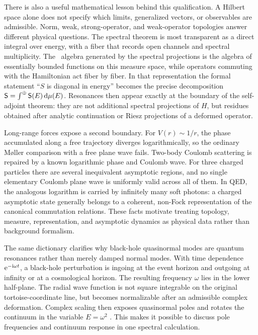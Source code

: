 There is also a useful mathematical lesson behind this qualification.  A
Hilbert space alone does not specify which limits, generalized vectors, or
observables are admissible.  Norm, weak, strong-operator, and weak-operator
topologies answer different physical questions.  The spectral theorem is most
transparent as a direct integral over energy, with a fiber that records open
channels and spectral multiplicity.  The \vN\ algebra generated by the
spectral projections is the algebra of essentially bounded functions on this
measure space, while operators commuting with the Hamiltonian act fiber by
fiber.  In that representation the formal statement ``$S$ is diagonal in
energy'' becomes the precise decomposition
$\mathsf{S}=\int^\oplus \mathsf{S}(E)\,\mathrm{d}\mu(E)$.
Resonances then appear exactly at the boundary of the self-adjoint theorem:
they are not additional spectral projections of $H$, but residues obtained
after analytic continuation or Riesz projections of a deformed operator.

Long-range forces expose a second boundary.  For $V(r)\sim 1/r$, the phase
accumulated along a free trajectory diverges logarithmically, so the ordinary
M{\o}ller comparison with a free plane wave fails.  Two-body Coulomb scattering
is repaired by a known logarithmic phase and Coulomb wave.  For three charged
particles there are several inequivalent asymptotic regions, and no single
elementary Coulomb plane wave is uniformly valid across all of them.  In QED,
the analogous logarithm is carried by infinitely many soft photons: a charged
asymptotic state generally belongs to a coherent, non-Fock representation of
the canonical commutation relations.  These facts motivate treating topology,
measure, representation, and asymptotic dynamics as physical data rather than
background formalism.

The same dictionary clarifies why black-hole quasinormal modes are quantum
resonances rather than merely damped normal modes.  With time dependence
$\mathrm{e}^{-\mathrm{i}\omega t}$, a black-hole perturbation is ingoing at the event
horizon and outgoing at infinity or at a cosmological horizon.  The resulting
frequency $\omega$ lies in the lower half-plane.  The radial wave function is
not square integrable on the original tortoise-coordinate line, but becomes
normalizable after an admissible complex deformation.  Complex scaling then
exposes quasinormal poles and rotates the continuum in the variable
$E=\omega^2$
\cite{Ogawa:2026veu,Ogawa:2026dSCSM}.  This makes it possible to discuss pole
frequencies and continuum response in one spectral calculation.

